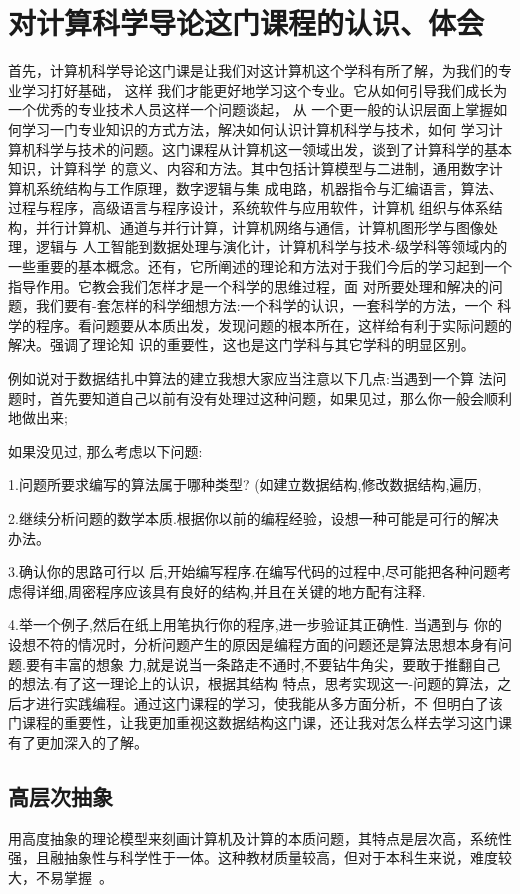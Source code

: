 \documentclass{article}
\begin{document}
\section{对计算科学导论这门课程的认识、体会}
首先，计算机科学导论这门课是让我们对这计算机这个学科有所了解，为我们的专业学习打好基础， 这样 我们才能更好地学习这个专业。它从如何引导我们成长为一个优秀的专业技术人员这样一个问题谈起， 从 一个更一般的认识层面上掌握如何学习一门专业知识的方式方法，解决如何认识计算机科学与技术，如何 学习计算机科学与技术的问题。这门课程从计算机这一领域出发，谈到了计算科学的基本知识，计算科学 的意义、内容和方法。其中包括计算模型与二进制，通用数字计算机系统结构与工作原理，数字逻辑与集 成电路，机器指令与汇编语言，算法、过程与程序，高级语言与程序设计，系统软件与应用软件，计算机 组织与体系结构，并行计算机、通道与并行计算，计算机网络与通信，计算机图形学与图像处理，逻辑与 人工智能到数据处理与演化计，计算机科学与技术-级学科等领域内的一些重要的基本概念。还有，它所阐述的理论和方法对于我们今后的学习起到一个指导作用。它教会我们怎样才是一个科学的思维过程，面 对所要处理和解决的问题，我们要有-套怎样的科学细想方法:一个科学的认识，一套科学的方法，一个 科学的程序。看问题要从本质出发，发现问题的根本所在，这样给有利于实际问题的解决。强调了理论知 识的重要性，这也是这门学科与其它学科的明显区别。\par
例如说对于数据结扎中算法的建立我想大家应当注意以下几点:当遇到一个算 法问题时，首先要知道自己以前有没有处理过这种问题，如果见过，那么你一般会顺利地做出来;\par
如果没见过, 那么考虑以下问题:\par1.问题所要求编写的算法属于哪种类型? (如建立数据结构,修改数据结构,遍历,\par2.继续分析问题的数学本质.根据你以前的编程经验，设想一种可能是可行的解决办法。\par3.确认你的思路可行以 后,开始编写程序.在编写代码的过程中,尽可能把各种问题考虑得详细,周密程序应该具有良好的结构,并且在关键的地方配有注释.\par4.举一个例子,然后在纸上用笔执行你的程序,进一步验证其正确性. 当遇到与 你的设想不符的情况时，分析问题产生的原因是编程方面的问题还是算法思想本身有问题.要有丰富的想象 力,就是说当一条路走不通时,不要钻牛角尖，要敢于推翻自己的想法.有了这一理论上的认识，根据其结构 特点，思考实现这一-问题的算法，之后才进行实践编程。通过这门课程的学习，使我能从多方面分析，不 但明白了该门课程的重要性，让我更加重视这数据结构这门课，还让我对怎么样去学习这门课有了更加深入的了解。

\par

\subsection{高层次抽象}
用高度抽象的理论模型来刻画计算机及计算的本质问题，其特点是层次高，系统性强，且融抽象性与科学性于一体。这种教材质量较高，但对于本科生来说，难度较大，不易掌握 。
\end{document}
